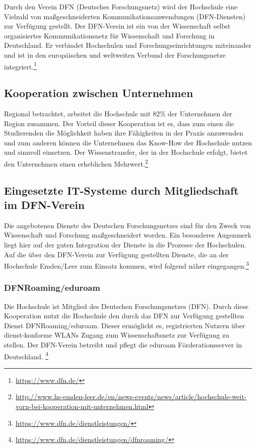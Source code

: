 Durch den Verein DFN (Deutsches Forschungsnetz) wird der Hochschule eine Vielzahl von maßgeschneiderten Kommunikationsanwendungen (DFN-Diensten) zur Verfügung gestellt. Der DFN-Verein ist ein von der Wissenschaft selbst organisiertes Kommunikationsnetz für Wissenschaft und Forschung in Deutschland. Er verbindet Hochschulen und Forschungseinrichtungen miteinander und ist in den europäischen und weltweiten  Verbund der Forschungsnetze integriert.\footnote{\url{https://www.dfn.de/}}

\subsection{Kooperation zwischen Unternehmen}
Regional betrachtet, arbeitet die Hochschule mit 82\% der Unternehmen der Region zusammen. Der Vorteil dieser Kooperation ist es, dass zum einen die Studierenden die Möglichkeit haben ihre Fähigkeiten in der Praxis anzuwenden und zum anderen können die Unternehmen das Know-How  der Hochschule nutzen und sinnvoll einsetzen. Der Wissenstransfer, der in der Hochschule erfolgt, bietet den Unternehmen einen erheblichen Mehrwert.\footnote{\url{http://www.hs-emden-leer.de/en/news-events/news/article/hochschule-weit-vorn-bei-kooperation-mit-unternehmen.html}}

\subsection{Eingesetzte IT-Systeme durch Mitgliedschaft im DFN-Verein}
Die angebotenen Dienste des Deutschen Forschungsnetzes sind für den Zweck von Wissenschaft und Forschung maßgeschneidert worden. Ein besonderes Augenmerk liegt hier auf der guten Integration der Dienste in die Prozesse der Hochschulen.  Auf die über den DFN-Verein zur Verfügung gestellten Dienste, die an der Hochschule Emden/Leer zum Einsatz kommen, wird folgend näher eingegangen.\footnote{\url{https://www.dfn.de/dienstleistungen/}}

\subsubsection{DFNRoaming/eduroam}
Die Hochschule ist Mitglied des Deutschen Forschungsnetzes (DFN). Durch diese Kooperation nutzt die Hochschule den durch das DFN zur Verfügung gestellten Dienst DFNRoaming/eduroam. Dieser ermöglicht es, registrierten Nutzern über dienst-konforme WLANs Zugang zum Wissenschaftsnetz zur Verfügung zu stellen. Der DFN-Verein betreibt und pflegt die eduroam Förderationsserver in Deutschland. \footnote{\url{https://www.dfn.de/dienstleistungen/dfnroaming/}} 

